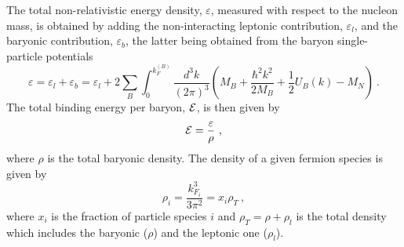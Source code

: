 The total non-relativistic energy density, $\varepsilon$, measured with
respect to the nucleon mass, is
obtained by adding the non-interacting 
leptonic contribution, $\varepsilon_l$, and  the
baryonic contribution, $\varepsilon_b$, the latter being obtained
from the baryon
single-particle potentials
\begin{equation}
\varepsilon=\varepsilon_l+\varepsilon_b=\varepsilon_l+2\sum_{B}
\int_0^{k_F^{(B)}} \frac{d^3 k}{(2\pi)^3}
\left(M_B + \frac{\hbar^2k^2}{2M_B}+\frac{1}{2}U_B(k) - M_N \right) \ .
\label{eq:binding}
\end{equation}
The total binding
energy per baryon, ${\cal E}$, is then given by
\begin{equation}
{\cal E}=\frac{\varepsilon}{\rho} \ ,
\label{eq:binding2}
\end{equation}
where $\rho$ is the total baryonic density. The density of a given fermion 
species is given by
\begin{equation}
\rho_{i}=\frac{k_{F_i}^3}{3\pi^2}=x_{i}\rho_T \ ,
\end{equation}
where
$x_i$ is the fraction of particle species $i$ and
$\rho_T=\rho+\rho_l$ is the total density which includes the
baryonic ($\rho$) and 
the leptonic one ($\rho_l$).


